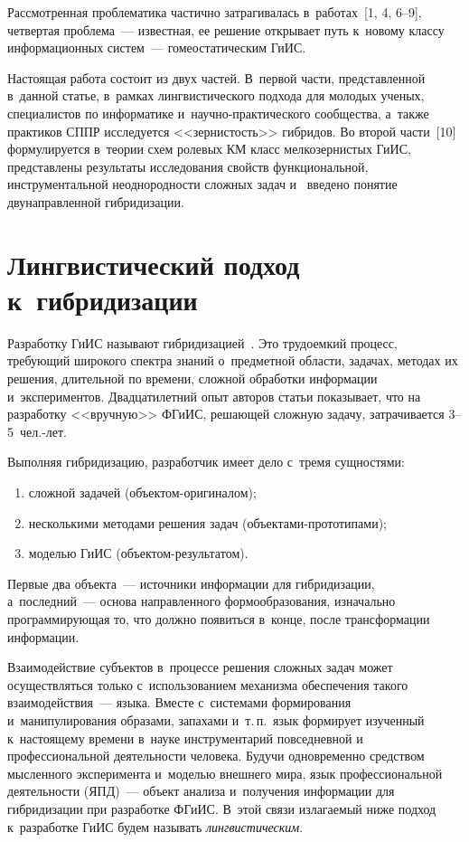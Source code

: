 \begin{multicols}{2}
  Рассмотренная проблематика частично затрагивалась в~работах~[1, 4, 6--9], 
  четвертая проб\-ле\-ма~--- известная, ее решение открывает путь к~новому 
классу информационных сис\-тем~--- гомеостатическим ГиИС. 
  
  Настоящая работа состоит из двух частей. В~первой части, представленной в~данной 
статье, в~рамках лингвистического подхода для молодых ученых, специалистов по 
информатике и~на\-уч\-но-прак\-ти\-че\-ско\-го сообщества, а~также практиков 
СППР исследуется <<зернистость>> гибридов. Во второй части~[10] 
 формулируется в~теории схем ролевых КМ класс 
мелкозернистых ГиИС, представлены результаты 
исследования свойств функциональной, инструментальной неоднородности сложных задач и~
введено понятие двунаправленной гибридизации.

\section{Лингвистический подход к~гибридизации}

  Разработку ГиИС называют гибридизацией~\cite{4-kir, 7-kir}. Это трудоемкий процесс, 
требующий широкого спектра знаний о~предметной области, задачах, методах их решения, 
длительной по времени, сложной обработки информации и~экспериментов. Два\-дца\-ти\-лет\-ний опыт 
авторов статьи показывает, что на разработку <<вручную>> ФГиИС, 
решающей сложную задачу, затрачивается 3--5~чел.-лет.
  
  Выполняя гибридизацию, разработчик имеет дело с~тремя сущностями: 
  \begin{enumerate}[(1)]
  \item сложной задачей 
(объ\-ек\-том-ори\-ги\-на\-лом);
\item  несколькими методами решения задач  
(объ\-ек\-та\-ми-про\-то\-ти\-па\-ми);
\item моделью ГиИС (объ\-ек\-том-ре\-зуль\-та\-том).
\end{enumerate}
 Первые 
два объекта~--- источники информации для гибридизации, а~последний~--- основа 
направленного формообразования, изначально программирующая то, что должно появиться 
в~конце, после трансформации информации. 
  
  Взаимодействие субъектов в~процессе решения сложных задач может осуществляться 
только с~использованием механизма обеспечения такого взаимодействия~--- языка. Вместе 
с~системами формирования и~манипулирования образами, запахами\linebreak
 и~т.\,п.\ язык формирует 
изученный к~настоящему времени в~науке инструментарий повседневной и~
профессиональной деятельности человека. Будучи одновременно средством мысленного 
эксперимента и~моделью внешнего мира, язык профессиональной деятельности (ЯПД)~--- 
объект анализа и~получения информации для гибридизации при разработке ФГиИС. 
В~этой связи излагаемый ниже подход к~разработке ГиИС будем называть 
\textit{лингвистическим}.
  

\end{multicols}
